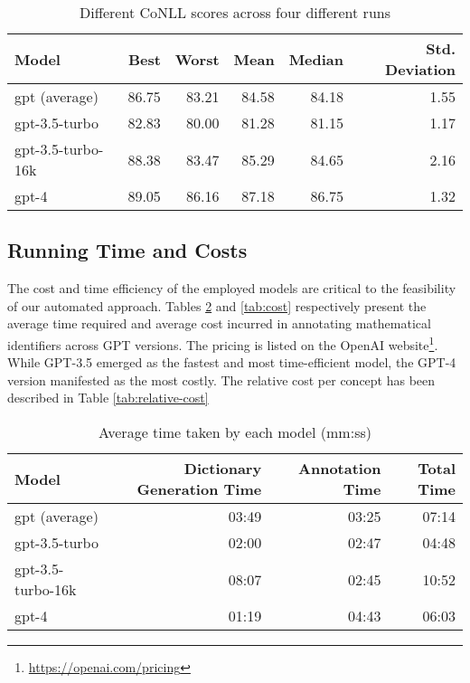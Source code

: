 \begin{table}[htpb]
  \centering
  \begin{tabular}{lrrrrr}
    \hline
    Model & Best & Worst & Mean & Median & Std. Deviation \\
    \hline
    gpt (average) & 86.75 & 83.21 & 84.58 & 84.18 & 1.55 \\
    gpt-3.5-turbo & 82.83 & 80.00 & 81.28 & 81.15 & 1.17 \\
    gpt-3.5-turbo-16k & 88.38 & 83.47 & 85.29 & 84.65 & 2.16 \\
    gpt-4 & 89.05 & 86.16 & 87.18 & 86.75 & 1.32 \\
    \hline
  \end{tabular}
  \caption[Statistics of variance]{Different CoNLL scores across four different runs}
  \label{tab:variance}
\end{table}

\subsection{Running Time and Costs}

The cost and time efficiency of the employed models are critical to the feasibility of our automated approach. Tables \ref{tab:time} and \ref{tab:cost} respectively present the average time required and average cost incurred in annotating mathematical identifiers across GPT versions. The pricing is listed on the OpenAI website\footnote{\url{https://openai.com/pricing}}. While GPT-3.5 emerged as the fastest and most time-efficient model, the GPT-4 version manifested as the most costly. The relative cost per concept has been described in Table \ref{tab:relative-cost}

\begin{table}[htpb]
  \centering
  \begin{tabular}{lrrr}
    \hline
    Model & Dictionary Generation Time & Annotation Time & Total Time \\
    \hline
    gpt (average) & 03:49 & 03:25 & 07:14 \\
    gpt-3.5-turbo & 02:00 & 02:47 & 04:48 \\
    gpt-3.5-turbo-16k & 08:07 & 02:45 & 10:52 \\
    gpt-4 & 01:19 & 04:43 & 06:03 \\
    \hline
  \end{tabular}
  \caption[Average time taken]{Average time taken by each model (mm:ss)}
  \label{tab:time}
\end{table}

